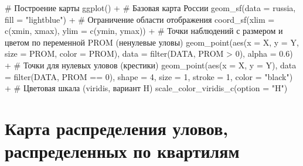 \documentclass[
  letterpaper,
  DIV=11,
  numbers=noendperiod]{scrreprt}
\newenvironment{Shaded}{\begin{snugshade}}{\end{snugshade}}
\newcommand{\AttributeTok}[1]{\textcolor[rgb]{0.40,0.45,0.13}{#1}}
\newcommand{\CommentTok}[1]{\textcolor[rgb]{0.37,0.37,0.37}{#1}}
\newcommand{\DecValTok}[1]{\textcolor[rgb]{0.68,0.00,0.00}{#1}}
\newcommand{\FloatTok}[1]{\textcolor[rgb]{0.68,0.00,0.00}{#1}}
\newcommand{\FunctionTok}[1]{\textcolor[rgb]{0.28,0.35,0.67}{#1}}
\newcommand{\NormalTok}[1]{\textcolor[rgb]{0.00,0.23,0.31}{#1}}
\newcommand{\SpecialCharTok}[1]{\textcolor[rgb]{0.37,0.37,0.37}{#1}}
\newcommand{\StringTok}[1]{\textcolor[rgb]{0.13,0.47,0.30}{#1}}
\begin{document}
\begin{Shaded}
\begin{Highlighting}[]
\CommentTok{\# Построение карты}
\FunctionTok{ggplot}\NormalTok{() }\SpecialCharTok{+}
  \CommentTok{\# Базовая карта России}
  \FunctionTok{geom\_sf}\NormalTok{(}\AttributeTok{data =}\NormalTok{ russia, }\AttributeTok{fill =} \StringTok{"lightblue"}\NormalTok{) }\SpecialCharTok{+} 
  \CommentTok{\# Ограничение области отображения}
  \FunctionTok{coord\_sf}\NormalTok{(}\AttributeTok{xlim =} \FunctionTok{c}\NormalTok{(xmin, xmax), }\AttributeTok{ylim =} \FunctionTok{c}\NormalTok{(ymin, ymax)) }\SpecialCharTok{+}
  \CommentTok{\# Точки наблюдений с размером и цветом по переменной PROM (ненулевые уловы)}
  \FunctionTok{geom\_point}\NormalTok{(}\FunctionTok{aes}\NormalTok{(}\AttributeTok{x =}\NormalTok{ X, }\AttributeTok{y =}\NormalTok{ Y, }\AttributeTok{size =}\NormalTok{ PROM, }\AttributeTok{color =}\NormalTok{ PROM),}
             \AttributeTok{data =} \FunctionTok{filter}\NormalTok{(DATA, PROM }\SpecialCharTok{\textgreater{}} \DecValTok{0}\NormalTok{), }\AttributeTok{alpha =} \FloatTok{0.6}\NormalTok{) }\SpecialCharTok{+}
  \CommentTok{\# Точки для нулевых уловов (крестики)}
  \FunctionTok{geom\_point}\NormalTok{(}\FunctionTok{aes}\NormalTok{(}\AttributeTok{x =}\NormalTok{ X, }\AttributeTok{y =}\NormalTok{ Y),}
             \AttributeTok{data =} \FunctionTok{filter}\NormalTok{(DATA, PROM }\SpecialCharTok{==} \DecValTok{0}\NormalTok{),}
             \AttributeTok{shape =} \DecValTok{4}\NormalTok{, }\AttributeTok{size =} \DecValTok{1}\NormalTok{, }\AttributeTok{stroke =} \DecValTok{1}\NormalTok{, }\AttributeTok{color =} \StringTok{"black"}\NormalTok{) }\SpecialCharTok{+}
  \CommentTok{\# Цветовая шкала (viridis, вариант H)}
  \FunctionTok{scale\_color\_viridis\_c}\NormalTok{(}\AttributeTok{option =} \StringTok{"H"}\NormalTok{)}
\end{Highlighting}
\end{Shaded}

\section{Карта распределения уловов, распределенных по
квартилям}\label{ux43aux430ux440ux442ux430-ux440ux430ux441ux43fux440ux435ux434ux435ux43bux435ux43dux438ux44f-ux443ux43bux43eux432ux43eux432-ux440ux430ux441ux43fux440ux435ux434ux435ux43bux435ux43dux43dux44bux445-ux43fux43e-ux43aux432ux430ux440ux442ux438ux43bux44fux43c}
\end{document}
